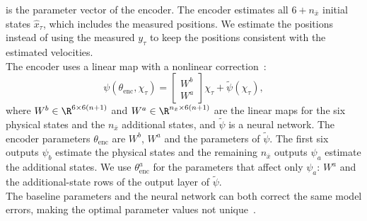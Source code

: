 is the parameter vector of the encoder.
The encoder estimates all $6+n_{\bar x}$ initial states $\hat x_\tau$, 
which includes the measured positions.
We estimate the positions instead of using the measured $y_\tau$ to keep 
the positions consistent with the estimated velocities.
\\
The encoder uses a linear map with a nonlinear
correction~\cite[Eq.~(8)]{hoekstra2026encoder}:
\begin{equation}
 \psi(\theta_{\mathrm{enc}},\chi_\tau)
 =\begin{bmatrix}W^b\\ W^a\end{bmatrix}\chi_\tau
  +\tilde\psi(\chi_\tau),
 \label{eq:aug_enc_lin}
\end{equation}
where $W^b\in\R^{6\times6(n+1)}$ and $W^a\in\R^{n_{\bar x}\times6(n+1)}$ are
the linear maps for the six physical states and the $n_{\bar x}$ additional
states, and $\tilde\psi$ is a neural network.
The encoder parameters $\theta_{\mathrm{enc}}$ are $W^b$, $W^a$ and the
parameters of $\tilde\psi$.
The first six outputs $\psi_b$ estimate the physical states and the remaining
$n_{\bar x}$ outputs $\psi_a$ estimate the additional states.
We use $\theta^a_{\mathrm{enc}}$ for the parameters
that affect only $\psi_a$: $W^a$ and the additional-state
rows of the output layer of $\tilde\psi$.
\\
The baseline parameters and the neural network can both correct the same
model errors, making the optimal parameter values  
not unique~\cite[Sec.~5.2]{hoekstra2026lfr}.
\\
